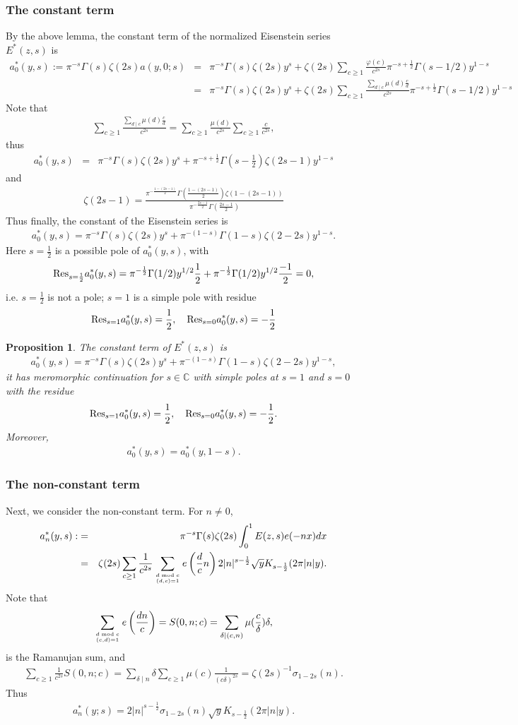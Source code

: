 \documentclass[11pt,reqno]{amsart}
\newcommand{\bna}{\begin{eqnarray*}}
\newcommand{\ena}{\end{eqnarray*}}
\def\res{{\rm Res}}
\def\C{\mathbb{C}}
\newtheorem{prop}[lemma]{Proposition}
\theoremstyle{definition}
\begin{document}
\subsubsection{The constant term}
By the above lemma, the constant term of the normalized  Eisenstein series
$E^*(z,s)$ is
\bna
a^*_0(y,s):=\pi^{-s}\Gamma(s)\zeta(2s)a(y,0;s)
&=&\pi^{-s}\Gamma(s)\zeta(2s) y^s +\zeta(2s)
\sum_{c\geq 1}\frac{\varphi(c)}{c^{2s}}
\pi^{-s+\frac{1}{2}}\Gamma(s-1/2)y^{1-s}\\
&=&\pi^{-s}\Gamma(s)\zeta(2s) y^s +\zeta(2s)
\sum_{c\geq 1}\frac{\sum_{d\mid c}\mu(d)\frac{c}{d}}{c^{2s}}
\pi^{-s+\frac{1}{2}}\Gamma(s-1/2)y^{1-s}
\ena
Note that
\bna
\sum_{c\geq 1}\frac{\sum_{d\mid c}\mu(d)\frac{c}{d}}{c^{2s}}
=\sum_{c\geq 1}\frac{\mu(d)}{c^{2s}}\sum_{c\geq 1}\frac{c}{c^{2s}},
\ena
thus
\bna
a^*_0(y,s)&=&\pi^{-s}\Gamma(s)\zeta(2s)y^s+\pi^{-s+\frac{1}{2}}\Gamma(s-\frac{1}{2})
\zeta(2s-1)y^{1-s}
\ena
and
\bna
\zeta(2s-1)=\frac{\pi^{-\frac{1-(2s-1)}{2}}\Gamma\left(\frac{1-(2s-1)}{2}\right)\zeta(1-(2s-1))}
{\pi^{-\frac{2s-1}{2}}\Gamma(\frac{2s-1}{2})}
\ena
Thus finally, the constant of the Eisenstein series is
\bna
a^*_0(y,s)=\pi^{-s}\Gamma(s)\zeta(2s)y^s+\pi^{-(1-s)}\Gamma(1-s)\zeta(2-2s)y^{1-s}.
\ena
Here $s=\frac{1}{2}$ is a possible pole of $a^*_0(y,s)$, with
\bna
\res_{s=\frac{1}{2}}a^*_0(y,s)=\pi^{-\frac{1}{2}}\Gamma(1/2) y^{1/2}\frac{1}{2}
+\pi^{-\frac{1}{2}}\Gamma(1/2) y^{1/2}\frac{-1}{2}=0,
\ena
i.e. $s=\frac{1}{2}$ is not a pole; $s=1$ is a simple pole with residue
\bna
\res_{s=1}a^*_0(y,s)=\frac{1}{2},\quad \res_{s=0}a^*_0(y,s)=-\frac{1}{2}
\ena
\begin{prop}The constant term of $E^*(z,s)$ is
\bna
a^*_0(y,s)=\pi^{-s}\Gamma(s)\zeta(2s)y^s+\pi^{-(1-s)}\Gamma(1-s)\zeta(2-2s)y^{1-s},
\ena
it has meromorphic continuation for $s\in\C$ with simple poles at $s=1$ and $s=0$
with the residue
\bna
\res_{s=1}a^*_0(y,s)=\frac{1}{2},\quad \res_{s=0}a^*_0(y,s)=-\frac{1}{2}.
\ena
Moreover,
\bna
a^*_0(y,s)=a^*_0(y,1-s).
\ena
\end{prop}


\subsubsection{The non-constant term}
Next, we consider the non-constant term. For $n\neq 0$,
\bna
a^*_n(y,s):&=&\pi^{-s}\Gamma(s)\zeta(2s)\int_0^1 E(z,s)e(-nx)dx\\
&=&\zeta(2s)\sum_{c\geq 1}\frac{1}{c^{2s}}\sum_{d\bmod c\atop(d,c)=1}
e\left(\frac{d}{c}n\right)2|n|^{s-\frac{1}{2}}\sqrt{y}K_{s-\frac{1}{2}}(2\pi|n|y).
\ena
Note that
\bna
\sum_{d\bmod c\atop(c,d)=1}e\left(\frac{dn}{c}\right)=
S(0,n;c)=\sum_{\delta\mid (c,n)}\mu(\frac{c}{\delta})\delta,
\ena
is the Ramanujan sum, and
\bna
\sum_{c\geq 1}\frac{1}{c^{2s}}S(0,n;c)
=\sum_{\delta\mid n}\delta \sum_{c\geq 1}\mu(c)\frac{1}{(c\delta)^{2s}}
=\zeta(2s)^{-1}\sigma_{1-2s}(n).
\ena
Thus
\bna
a^*_n(y;s)=
2|n|^{s-\frac{1}{2}}\sigma_{1-2s}(n)\sqrt{y}K_{s-\frac{1}{2}}(2\pi |n|y).
\ena
\end{document}
